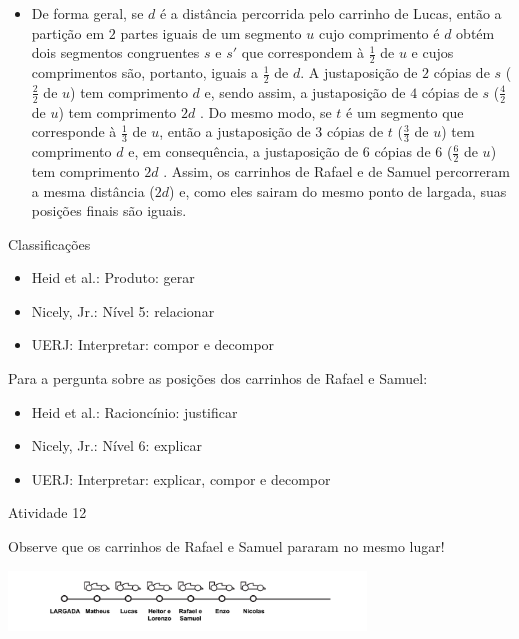 \begin{multicols}{2}
\begin{itemize}
    \item       De forma geral, se       $d$       é a distância percorrida pelo carrinho de Lucas, então a partição em       $2$       partes iguais de um segmento       $u$       cujo comprimento é       $d$       obtém dois segmentos congruentes       $s$       e       $s'$       que correspondem à       $\frac{1}{2}$       de       $u$       e cujos comprimentos são, portanto, iguais a       $\frac{1}{2}$       de       $d$. A justaposição de       $2$       cópias de       $s$       ($\frac{2}{2}$       de       $u$) tem comprimento       $d$       e, sendo assim, a justaposição de       $4$       cópias de       $s$       ($\frac{4}{2}$ de $u$) tem comprimento       $2d$      . Do mesmo modo, se       $t$       é um segmento que corresponde à       $\frac{1}{3}$       de       $u$, então a justaposição de       $3$       cópias de       $t$       ($\frac{3}{3}$       de       $u$) tem comprimento       $d$       e, em consequência, a justaposição de       $6$       cópias de       $6$       ($\frac{6}{2}$       de       $u$) tem comprimento       $2d$      . Assim, os carrinhos de Rafael e de Samuel percorreram a mesma distância ($2d$) e, como eles sairam do mesmo ponto de largada, suas posições finais são iguais.
\end{itemize} %


  Classificações
\begin{itemize} %
    \item       Heid et al.: Produto: gerar
    \item       Nicely, Jr.: Nível 5: relacionar
    \item       UERJ: Interpretar: compor e decompor
\end{itemize} %


  Para a pergunta sobre as posições dos carrinhos de Rafael e Samuel:
\begin{itemize} %
    \item       Heid et al.: Racioncínio: justificar
    \item       Nicely, Jr.: Nível 6: explicar
    \item       UERJ: Interpretar: explicar, compor e decompor
\end{itemize} %


\begin{resposta*}{Atividade 12}

Observe que os carrinhos de Rafael e Samuel pararam no mesmo lugar!

\hspace{-15mm} \includegraphics[width=95mm, keepaspectratio]{..//media/cap2/secoes/pngs_licao_02/ativ12_resposta.png}


\end{resposta*}
\end{multicols}
